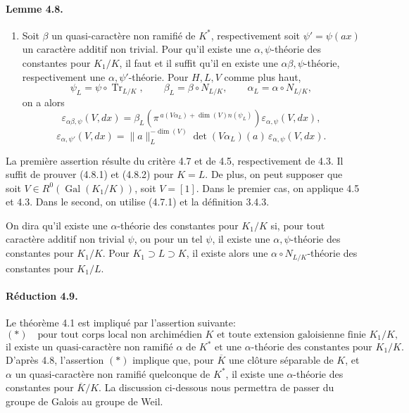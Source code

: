 \documentclass[10pt]{article}
\newcommand{\Gal}{\operatorname{Gal}}
\newcommand{\Tr}{\operatorname{Tr}}
\providecommand{\Gal}{\operatorname{Gal}}
\providecommand{\Gal}{\operatorname{Gal}}
\providecommand{\Tr}{\operatorname{Tr}}
\providecommand{\Gal}{\operatorname{Gal}}
\providecommand{\Tr}{\operatorname{Tr}}
\providecommand{\Gal}{\operatorname{Gal}}
\providecommand{\Tr}{\operatorname{Tr}}
\begin{document}
\paragraph{Lemme 4.8.} 
\begin{enumerate}[label=(\roman*)]
\item Soit \(\beta\) un quasi-caractère non ramifié de \(K^*\), respectivement soit \(\psi'=\psi(ax)\) un caractère additif non trivial. Pour qu'il existe une \(\alpha,\psi\)-théorie des constantes pour \(K_1/K\), il faut et il suffit qu'il en existe une \(\alpha\beta,\psi\)-théorie, respectivement une \(\alpha,\psi'\)-théorie. Pour \(H,L,V\) comme plus haut,
\[
\psi_L=\psi\circ\Tr_{L/K},\qquad
\beta_L=\beta\circ N_{L/K},\qquad
\alpha_L=\alpha\circ N_{L/K},
\]
on a alors
\[
\tag{4.8.1}
\varepsilon_{\alpha\beta,\psi}(V,dx)
=
\beta_L\!\left(\pi^{\,a(V\alpha_L)+\dim(V)n(\psi_L)}\right)
\varepsilon_{\alpha,\psi}(V,dx),
\]
\[
\tag{4.8.2}
\varepsilon_{\alpha,\psi'}(V,dx)
=
\|a\|_L^{-\dim(V)}
\det(V\alpha_L)(a)\,
\varepsilon_{\alpha,\psi}(V,dx).
\]
\end{enumerate}
La première assertion résulte du critère 4.7 et de 4.5, respectivement de 4.3. Il suffit de prouver (4.8.1) et (4.8.2) pour \(K=L\). De plus, on peut supposer que soit \(V\in R^0(\Gal(K_1/K))\), soit \(V=[1]\). Dans le premier cas, on applique 4.5 et 4.3. Dans le second, on utilise (4.7.1) et la définition 3.4.3.

On dira qu'il existe une \(\alpha\)-théorie des constantes pour \(K_1/K\) si, pour tout caractère additif non trivial \(\psi\), ou pour un tel \(\psi\), il existe une \(\alpha,\psi\)-théorie des constantes pour \(K_1/K\). Pour \(K_1\supset L\supset K\), il existe alors une \(\alpha\circ N_{L/K}\)-théorie des constantes pour \(K_1/L\).

\paragraph{Réduction 4.9.} Le théorème 4.1 est impliqué par l'assertion suivante:
\[
(*)\quad
\text{pour tout corps local non archimédien }K\text{ et toute extension galoisienne finie }K_1/K,
\]
\[
\text{il existe un quasi-caractère non ramifié }\alpha\text{ de }K^*
\text{ et une }\alpha\text{-théorie des constantes pour }K_1/K.
\]
D'après 4.8, l'assertion \((*)\) implique que, pour \(\overline K\) une clôture séparable de \(K\), et \(\alpha\) un quasi-caractère non ramifié quelconque de \(K^*\), il existe une \(\alpha\)-théorie des constantes pour \(\overline K/K\). La discussion ci-dessous nous permettra de passer du groupe de Galois au groupe de Weil.
\end{document}
